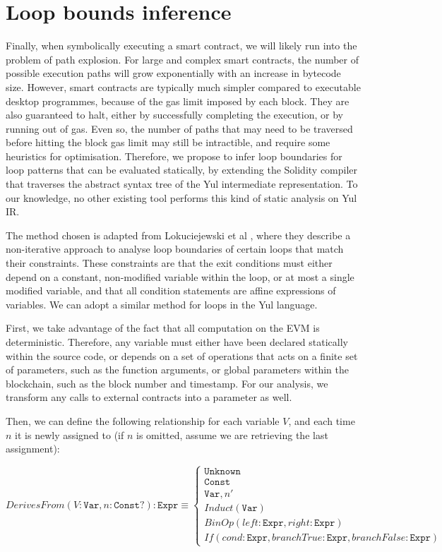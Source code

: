 \section{Loop bounds inference}

Finally, when symbolically executing a smart contract, we will likely run into the problem of path explosion. For large and complex smart
contracts, the number of possible execution paths will grow exponentially with an increase in bytecode size. However, smart contracts
are typically much simpler compared to executable desktop programmes, because of the gas limit imposed by each block. They are also guaranteed
to halt, either by successfully completing the execution, or by running out of gas. Even so, the number of paths that may need to be traversed
before hitting the block gas limit may still be intractible, and require some heuristics for optimisation. Therefore, we propose to infer
loop boundaries for loop patterns that can be evaluated statically, by extending the Solidity compiler that traverses the abstract syntax tree of the 
Yul intermediate representation. To our knowledge, no other existing tool performs this kind of
static analysis on Yul IR.

The method chosen is adapted from Lokuciejewski et al \cite{loopanalysis}, where they describe a non-iterative approach to analyse loop
boundaries of certain loops that match their constraints. These constraints are that the exit conditions must either depend on a constant, 
non-modified variable within the loop, or at most a single modified variable, and that all condition statements are affine expressions of variables.
We can adopt a similar method for loops in the Yul language.

First, we take advantage of the fact that all computation on the EVM is deterministic. Therefore, any variable must either have been declared statically
within the source code, or depends on a set of operations that acts on a finite set of parameters, such as the function arguments, or global parameters
within the blockchain, such as the block number and timestamp. For our analysis, we transform any calls to external contracts into a parameter as well.

Then, we can define the following relationship for each variable $V$, and each time $n$ it is newly assigned to 
(if $n$ is omitted, assume we are retrieving the last assignment):

\begin{dmath}
  DerivesFrom(V: \texttt{Var}, n: \texttt{Const?}): \texttt{Expr} \equiv
  \begin{cases}
    \texttt{Unknown} \\
    \texttt{Const} \\
    \texttt{Var}, n'   \\
    Induct(\texttt{Var}) \\
    BinOp(left: \texttt{Expr},right: \texttt{Expr}) \\
    If(cond: \texttt{Expr}, branchTrue: \texttt{Expr}, branchFalse: \texttt{Expr})
  \end{cases}
\end{dmath}

